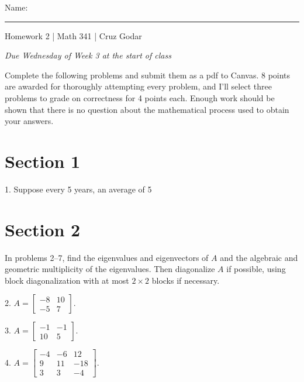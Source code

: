 \documentclass{article}
\begin{document}
\Large Name: \rule{2in}{0.15mm} \hfill Homework 2 | Math 341 | Cruz Godar \vspace{4pt} \normalsize

\textit{Due Wednesday of Week 3 at the start of class}

Complete the following problems and submit them as a pdf to Canvas. 8 points are awarded for thoroughly attempting every problem, and I'll select three problems to grade on correctness for 4 points each. Enough work should be shown that there is no question about the mathematical process used to obtain your answers.

\section{Section 1}

1. Suppose every 5 years, an average of 5%

\section{Section 2}

In problems 2--7, find the eigenvalues and eigenvectors of $A$ and the algebraic and geometric multiplicity of the eigenvalues. Then diagonalize $A$ if possible, using block diagonalization with at most $2 \times 2$ blocks if necessary.

2. $A = \left[\begin{array}{cc} -8& 10 \\ -5& 7 \end{array}\right]$.

3. $A = \left[\begin{array}{cc} -1& -1 \\ 10& 5 \end{array}\right]$.

4. $A = \left[\begin{array}{ccc} -4& -6& 12 \\ 9& 11& -18 \\ 3& 3& -4 \end{array}\right]$.
\end{document}

